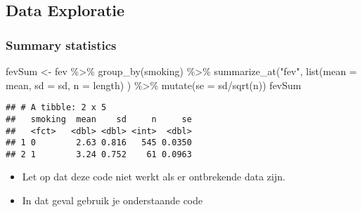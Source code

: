 \documentclass[
]{article}
\newenvironment{Shaded}{\begin{snugshade}}{\end{snugshade}}
\newcommand{\AttributeTok}[1]{\textcolor[rgb]{0.77,0.63,0.00}{#1}}
\newcommand{\FunctionTok}[1]{\textcolor[rgb]{0.00,0.00,0.00}{#1}}
\newcommand{\NormalTok}[1]{#1}
\newcommand{\OtherTok}[1]{\textcolor[rgb]{0.56,0.35,0.01}{#1}}
\newcommand{\SpecialCharTok}[1]{\textcolor[rgb]{0.00,0.00,0.00}{#1}}
\newcommand{\StringTok}[1]{\textcolor[rgb]{0.31,0.60,0.02}{#1}}
\providecommand{\tightlist}{%
  \setlength{\itemsep}{0pt}\setlength{\parskip}{0pt}}
\begin{document}
\hypertarget{data-exploratie}{%
\subsection{Data Exploratie}\label{data-exploratie}}

\hypertarget{summary-statistics}{%
\subsubsection{Summary statistics}\label{summary-statistics}}

\begin{Shaded}
\begin{Highlighting}[]
\NormalTok{fevSum }\OtherTok{\textless{}{-}}\NormalTok{ fev }\SpecialCharTok{\%\textgreater{}\%}
  \FunctionTok{group\_by}\NormalTok{(smoking) }\SpecialCharTok{\%\textgreater{}\%}
  \FunctionTok{summarize\_at}\NormalTok{(}\StringTok{"fev"}\NormalTok{, }
               \FunctionTok{list}\NormalTok{(}\AttributeTok{mean =}\NormalTok{ mean,}
                    \AttributeTok{sd =}\NormalTok{ sd,}
                    \AttributeTok{n =}\NormalTok{ length)}
\NormalTok{                ) }\SpecialCharTok{\%\textgreater{}\%}
  \FunctionTok{mutate}\NormalTok{(}\AttributeTok{se =}\NormalTok{ sd}\SpecialCharTok{/}\FunctionTok{sqrt}\NormalTok{(n))}
\NormalTok{fevSum}
\end{Highlighting}
\end{Shaded}

\begin{verbatim}
## # A tibble: 2 x 5
##   smoking  mean    sd     n     se
##   <fct>   <dbl> <dbl> <int>  <dbl>
## 1 0        2.63 0.816   545 0.0350
## 2 1        3.24 0.752    61 0.0963
\end{verbatim}

\begin{itemize}
\tightlist
\item
  Let op dat deze code niet werkt als er ontbrekende data zijn.
\item
  In dat geval gebruik je onderstaande code
\end{itemize}
\end{document}

